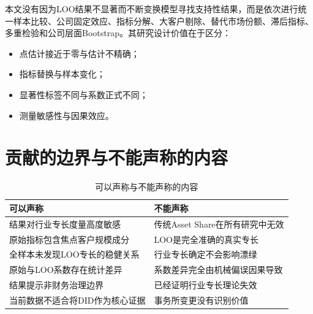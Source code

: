 \documentclass[12pt,a4paper]{article}
\begin{document}
本文没有因为LOO结果不显著而不断变换模型寻找支持性结果，而是依次进行统一样本比较、公司固定效应、指标分解、大客户剔除、替代市场份额、滞后指标、多重检验和公司层面Bootstrap。其研究设计价值在于区分：

\begin{itemize}
  \item 点估计接近于零与估计不精确；
  \item 指标替换与样本变化；
  \item 显著性标签不同与系数正式不同；
  \item 测量敏感性与因果效应。
\end{itemize}


\section{贡献的边界与不能声称的内容}

\begin{table}[htbp]
\centering
\caption{可以声称与不能声称的内容}
\begin{tabular}{p{}p{}}
\toprule
可以声称 & 不能声称 \\
\midrule
结果对行业专长度量高度敏感 & 传统Asset Share在所有研究中无效 \\
原始指标包含焦点客户规模成分 & LOO是完全准确的真实专长 \\
全样本未发现LOO专长的稳健关系 & 行业专长确定不会影响漂绿 \\
原始与LOO系数存在统计差异 & 系数差异完全由机械偏误因果导致 \\
结果提示非财务治理边界 & 已经证明行业专长理论失效 \\
当前数据不适合将DID作为核心证据 & 事务所变更没有识别价值 \\
\bottomrule
\end{tabular}
\end{table}
\end{document}
